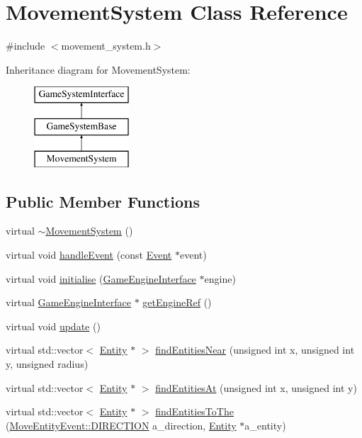 \hypertarget{classMovementSystem}{\section{Movement\-System Class Reference}
\label{classMovementSystem}
}


{\ttfamily \#include $<$movement\-\_\-system.\-h$>$}

Inheritance diagram for Movement\-System\-:\begin{figure}[H]
\begin{center}
\leavevmode
\includegraphics[height=3.000000cm]{classMovementSystem}
\end{center}
\end{figure}
\subsection*{Public Member Functions}
\begin{DoxyCompactItemize}
\item 
virtual \hyperlink{classMovementSystem_a51ef4a49db0f68096e421b3430954716}{$\sim$\-Movement\-System} ()
\item 
virtual void \hyperlink{classMovementSystem_ac2c594a6deb6349a376cd72f189971a3}{handle\-Event} (const \hyperlink{classEvent}{Event} $\ast$event)
\item 
virtual void \hyperlink{classGameSystemBase_a55b4fc27cbfccd3c724c2e5984d78625}{initialise} (\hyperlink{classGameEngineInterface}{Game\-Engine\-Interface} $\ast$engine)
\item 
virtual \hyperlink{classGameEngineInterface}{Game\-Engine\-Interface} $\ast$ \hyperlink{classGameSystemBase_a1954c5a1c79963554805bc25b2cd6072}{get\-Engine\-Ref} ()
\item 
virtual void \hyperlink{classGameSystemBase_a039d3086ac7fe50abdb110b569520d69}{update} ()
\item 
virtual std\-::vector$<$ \hyperlink{classEntity}{Entity} $\ast$ $>$ \hyperlink{classGameSystemBase_aae270a88f1077a091e6033514b889abd}{find\-Entities\-Near} (unsigned int x, unsigned int y, unsigned radius)
\item 
virtual std\-::vector$<$ \hyperlink{classEntity}{Entity} $\ast$ $>$ \hyperlink{classGameSystemBase_a7aa9912fc078d990dbfb480e411bd3bc}{find\-Entities\-At} (unsigned int x, unsigned int y)
\item 
virtual std\-::vector$<$ \hyperlink{classEntity}{Entity} $\ast$ $>$ \hyperlink{classGameSystemBase_a44456ef40ac565b9d6b65f3b1531a4ef}{find\-Entities\-To\-The} (\hyperlink{classMoveEntityEvent_a7058a943643bee9164a21e62e3392807}{Move\-Entity\-Event\-::\-D\-I\-R\-E\-C\-T\-I\-O\-N} a\-\_\-direction, \hyperlink{classEntity}{Entity} $\ast$a\-\_\-entity)
\end{DoxyCompactItemize}
